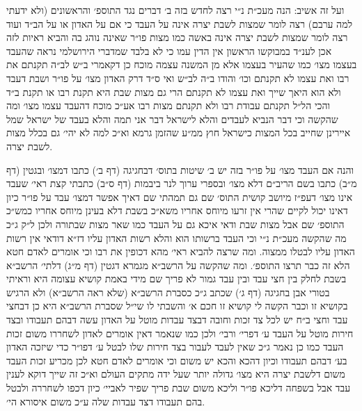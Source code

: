 \documentclass[12pt, openany]{book}
\begin{document}
\begin{multicols}{2}
ועל זה אשיב: הנה מעכ״ת נ״י רצה לחדש בזה ב׳ דברים נגד התוספ׳ והראשונים (ולא ידעתי למה ערבם) רצה לומר שמצות לשבת יצרה אינה על העבד כי אם על האדון או על הב״ד ועוד רצה לומר שמצות לשבת יצרה אינה באשה כמו מצות פו״ר שאינה נוהג בה והביא ראיות לזה אכן לענ״ד במבוקשו הראשון אין הדין עמו כי לא בלבד שמדברי הירושלמי נראה שהעבד בעצמו מצו׳ כמו שהעיר בעצמו אלא מן המשנה עצמה מוכח כן דקאמרי ב״ש לב״ה תקנתם את רבו ואת עצמו לא תקנתם וכו׳ והודו ב״ה לב״ש ואי ס״ד דרק האדון מצו׳ על פו״ר ושבת דעבד ולא הוא היאך שייך ואת עצמו לא תקנתם הרי גם מצות שבת היא תקנת רבו או תקנת ב״ד והכי הל״ל תקנתם עבודת רבו ולא תקנתם מצות רבו אע״כ מוכח דהעבד עצמו מצו׳ ומה שהקשה וכי דבר הנביא לעבדים והלא לישראל דבר אני תמה והלא בעבד של ישראל שמל איירינן שחייב בכל המצות כישראל חוץ ממ״ע שהזמן גרמא וא״כ למה לא יהי׳ גם בכלל מצות לשבת יצרה.\\\vspace{0pt}

והנה אם העבד מצו׳ על פו״ר בזה יש ב׳ שיטות בתוס׳ דבחגיגה (דף ב׳) כתבו דמצו׳ ובגטין (דף מ״ב) כתבו בשם הריב״ם דלא מצו׳ ובספרי ערוך לנר ביבמות (דף ס״ב) כתבתי קצת ראי׳ שעבד אינו מצו׳ דעפ״ז מיושב קושית התוס׳ שם גם תמהתי שם דאיך אפשר דמצו׳ עבד על פו״ר כיון דאינו יכול לקיים שהרי אין זרעו מיוחס אחריו משא״כ בשבת דלא בעינן מיוחס אחריו כמש״כ התוספ׳ שם אבל מצות שבת ודאי איכא גם על העבד כמו שאר מצות שבתורה ולכן ל״ק ג״כ מה שהקשה מעכ״ת נ״י וכי העבד ברשותו הוא והלא רשות האדון עליו דז״א דודאי אין רשות האדון עליו לבטלו ממצוה. ומה שרצה להביא ראי׳ מהא דכופין את רבו וכי אומרים לאדם חטא הלא זה כבר תרצו התוספ׳. ומה שהקשה על הרשב״א מגמרא דגטין (דף מ״ג) דלתי׳ הרשב״א בשבת לחלק בין חצי עבד ובין עבד גמור לא פריך שם מידי באמת קושיא עצומה היא וראיתי בטורי אבן בחגיגה (דף ג׳) שכתב ג״כ כסברת הרשב״א (שלא ראה הרשב״א) ולא הרגיש בקושיא זו וכבר הקשה לי קושיא זו חכם א׳ והשבתי לו שי״ל שסברת הרשב״א היא כן דבחצי עבד וחצי ב״ח יש לכל צד זכות וחובה דבצד עבדות מוטל על האדון עשה דבהם תעבודו ובצד חירות מוטל על העבד ע׳ דפרי׳ ורבי׳ ולכן כמו שנאמר דאין אומרים לאדון לשחררו משום זכות העבד כמו כן נאמר ג״כ שאין לעבד לעבור בצד חירות שלו לבטל ע׳ דפו״ר כדי שיזכה האדון בע׳ דבהם תעבודו וכיון דהכא והכא יש משום וכי אומרים לאדם חטא לכן מכריע זכות העבד משום דלשבת יצרה היא מצו׳ גדולה יותר שעל ידה מתקים העולם וא״כ זה שייך דוקא לענין עבד אבל בשפחה דליכא פו״ר וליכא משום שבת פריך שפיר לאביי׳ כיון דכפו לשחררה ולבטל בהם תעבודו דצד עבדות שלה ע״כ משום איסורא הי׳.\\\vspace{0pt}


\end{multicols}
\end{document}
